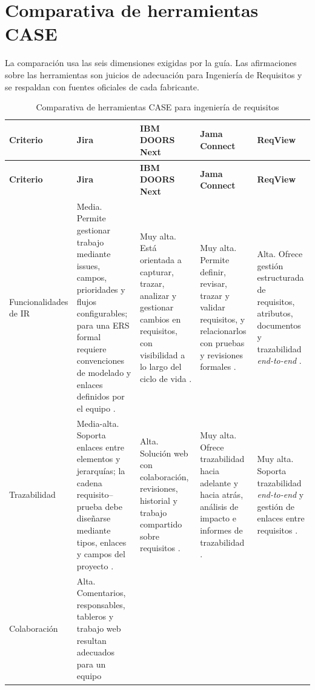 \documentclass[journal,onecolumn]{IEEEtran}
\begin{document}
	\section{Comparativa de herramientas CASE}
	\label{sec:comparativa}
	
	La comparación usa las seis dimensiones exigidas por la guía. Las afirmaciones sobre las
	herramientas son juicios de adecuación para Ingeniería de Requisitos y se respaldan con fuentes
	oficiales de cada fabricante.
	
	\begin{longtable}{L{1.9cm} L{2.9cm} L{2.9cm} L{2.9cm} L{2.9cm}}
		\caption{Comparativa de herramientas CASE para ingeniería de requisitos}
		\label{tab:case}\\
		\toprule
		\textbf{Criterio} & \textbf{Jira} & \textbf{IBM DOORS Next} & \textbf{Jama Connect} &
		\textbf{ReqView} \\
		\midrule
		\endfirsthead
		\toprule
		\textbf{Criterio} & \textbf{Jira} & \textbf{IBM DOORS Next} & \textbf{Jama Connect} &
		\textbf{ReqView} \\
		\midrule
		\endhead
		\bottomrule
		\endfoot
		Funcionalidades de IR &
		Media. Permite gestionar trabajo mediante issues, campos, prioridades y flujos configurables;
		para una ERS formal requiere convenciones de modelado y enlaces definidos por el equipo
		\cite{atlassian2026}. &
		Muy alta. Está orientada a capturar, trazar, analizar y gestionar cambios en requisitos, con
		visibilidad a lo largo del ciclo de vida \cite{ibmdoors2026}. &
		Muy alta. Permite definir, revisar, trazar y validar requisitos, y relacionarlos con pruebas y
		revisiones formales \cite{jama2026}. &
		Alta. Ofrece gestión estructurada de requisitos, atributos, documentos y trazabilidad
		\emph{end-to-end} \cite{reqview2026}. \\
		\addlinespace
		Trazabilidad &
		Media-alta. Soporta enlaces entre elementos y jerarquías; la cadena requisito--prueba debe
		diseñarse mediante tipos, enlaces y campos del proyecto \cite{atlassian2026}. &
		Alta. Solución web con colaboración, revisiones, historial y trabajo compartido sobre
		requisitos \cite{ibmdoors2026}. &
		Muy alta. Ofrece trazabilidad hacia adelante y hacia atrás, análisis de impacto e informes de
		trazabilidad \cite{jama2026}. &
		Muy alta. Soporta trazabilidad \emph{end-to-end} y gestión de enlaces entre requisitos
		\cite{reqview2026}. \\
		\addlinespace
		Colaboración &
		Alta. Comentarios, responsables, tableros y trabajo web resultan adecuados para un equipo

\end{longtable}
\end{document}
